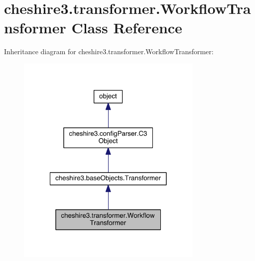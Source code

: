 \hypertarget{classcheshire3_1_1transformer_1_1_workflow_transformer}{\section{cheshire3.\-transformer.\-Workflow\-Transformer Class Reference}
\label{classcheshire3_1_1transformer_1_1_workflow_transformer}
}


Inheritance diagram for cheshire3.\-transformer.\-Workflow\-Transformer\-:
\nopagebreak
\begin{figure}[H]
\begin{center}
\leavevmode
\includegraphics[width=254pt]{classcheshire3_1_1transformer_1_1_workflow_transformer__inherit__graph}
\end{center}
\end{figure}


